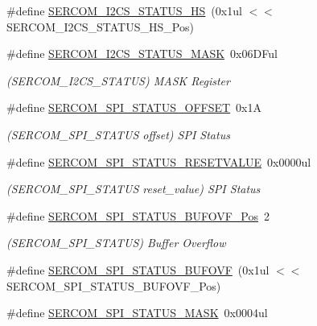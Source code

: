 \begin{DoxyCompactItemize}
\#define \mbox{\hyperlink{group___s_a_m_d21___s_e_r_c_o_m_gae0212247168ea9762e9b3fa7035fcc0d}{S\+E\+R\+C\+O\+M\+\_\+\+I2\+C\+S\+\_\+\+S\+T\+A\+T\+U\+S\+\_\+\+HS}}~(0x1ul $<$$<$ S\+E\+R\+C\+O\+M\+\_\+\+I2\+C\+S\+\_\+\+S\+T\+A\+T\+U\+S\+\_\+\+H\+S\+\_\+\+Pos)
\item 
\#define \mbox{\hyperlink{group___s_a_m_d21___s_e_r_c_o_m_ga7bd35aa131b258489a1a6c2512d8ea98}{S\+E\+R\+C\+O\+M\+\_\+\+I2\+C\+S\+\_\+\+S\+T\+A\+T\+U\+S\+\_\+\+M\+A\+SK}}~0x06\+D\+Ful
\begin{DoxyCompactList}\small\item\em (S\+E\+R\+C\+O\+M\+\_\+\+I2\+C\+S\+\_\+\+S\+T\+A\+T\+US) M\+A\+SK Register \end{DoxyCompactList}\item 
\#define \mbox{\hyperlink{group___s_a_m_d21___s_e_r_c_o_m_ga458489d6dcf389896eab9132b1e4f7af}{S\+E\+R\+C\+O\+M\+\_\+\+S\+P\+I\+\_\+\+S\+T\+A\+T\+U\+S\+\_\+\+O\+F\+F\+S\+ET}}~0x1A
\begin{DoxyCompactList}\small\item\em (S\+E\+R\+C\+O\+M\+\_\+\+S\+P\+I\+\_\+\+S\+T\+A\+T\+US offset) S\+PI Status \end{DoxyCompactList}\item 
\#define \mbox{\hyperlink{group___s_a_m_d21___s_e_r_c_o_m_ga265b7a803efc193e07756a55450dc3f0}{S\+E\+R\+C\+O\+M\+\_\+\+S\+P\+I\+\_\+\+S\+T\+A\+T\+U\+S\+\_\+\+R\+E\+S\+E\+T\+V\+A\+L\+UE}}~0x0000ul
\begin{DoxyCompactList}\small\item\em (S\+E\+R\+C\+O\+M\+\_\+\+S\+P\+I\+\_\+\+S\+T\+A\+T\+US reset\+\_\+value) S\+PI Status \end{DoxyCompactList}\item 
\#define \mbox{\hyperlink{group___s_a_m_d21___s_e_r_c_o_m_ga2309438799f876054076324234bd56b5}{S\+E\+R\+C\+O\+M\+\_\+\+S\+P\+I\+\_\+\+S\+T\+A\+T\+U\+S\+\_\+\+B\+U\+F\+O\+V\+F\+\_\+\+Pos}}~2
\begin{DoxyCompactList}\small\item\em (S\+E\+R\+C\+O\+M\+\_\+\+S\+P\+I\+\_\+\+S\+T\+A\+T\+US) Buffer Overflow \end{DoxyCompactList}\item 
\#define \mbox{\hyperlink{group___s_a_m_d21___s_e_r_c_o_m_gab8553642a6b5d5d87cf3f5a9afd61098}{S\+E\+R\+C\+O\+M\+\_\+\+S\+P\+I\+\_\+\+S\+T\+A\+T\+U\+S\+\_\+\+B\+U\+F\+O\+VF}}~(0x1ul $<$$<$ S\+E\+R\+C\+O\+M\+\_\+\+S\+P\+I\+\_\+\+S\+T\+A\+T\+U\+S\+\_\+\+B\+U\+F\+O\+V\+F\+\_\+\+Pos)
\item 
\#define \mbox{\hyperlink{group___s_a_m_d21___s_e_r_c_o_m_ga477f5ce5dfeff94c6dc44713f93d67a9}{S\+E\+R\+C\+O\+M\+\_\+\+S\+P\+I\+\_\+\+S\+T\+A\+T\+U\+S\+\_\+\+M\+A\+SK}}~0x0004ul

\end{DoxyCompactItemize}
